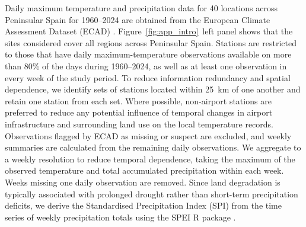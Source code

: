 \documentclass[APA,STIX1COL]{WileyNJD-v2}
\begin{document}
Daily maximum temperature and precipitation data for 40 locations across Peninsular Spain for 1960--2024 are obtained from the European Climate Assessment Dataset (ECAD) \citep{Klein2002}.
Figure~\ref{fig:app_intro}~left panel shows that the sites considered cover all regions across Peninsular Spain.
Stations are restricted to those that have daily maximum-temperature observations available on more than 80\% of the days during 1960--2024, as well as at least one observation in every week of the study period. 
To reduce information redundancy and spatial dependence, we identify sets of stations located within 25~km of one another and retain one station from each set. 
Where possible, non-airport stations are preferred to reduce any potential influence of temporal changes in airport infrastructure and surrounding land use on the local temperature records.
Observations flagged by ECAD as missing or suspect are excluded, and weekly summaries are calculated from the remaining daily observations.
We aggregate to a weekly resolution to reduce temporal dependence, taking the maximum of the observed temperature and total accumulated precipitation within each week. 
Weeks missing one daily observation are removed. 
Since land degradation is typically associated with prolonged drought rather than short-term precipitation deficits, we derive the Standardised Precipitation Index (SPI) \citep{McKee1993} from the time series of weekly precipitation totals using the SPEI R package \citep{SPEI}. 
\end{document}
